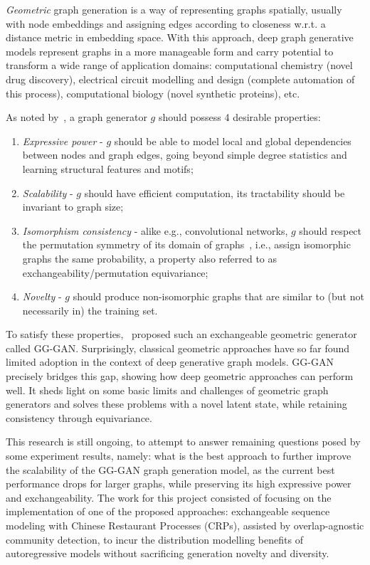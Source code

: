 \emph{Geometric} graph generation is a way of representing graphs spatially, usually with node embeddings and assigning edges according to closeness w.r.t. a distance metric in embedding space. With this approach, deep graph generative models represent graphs in a more manageable form and carry potential to transform a wide range of application domains: computational chemistry (novel drug discovery), electrical circuit modelling and design (complete automation of this process), computational biology (novel synthetic proteins), etc.

As noted by~\cite{krawczuk_gg-gan_2020}, a graph generator $g$ should possess 4 desirable properties:
\begin{enumerate}[1.]
\item \emph{Expressive power} - $g$ should be able to model local and global dependencies between nodes and graph edges, going beyond simple degree statistics and learning structural features and motifs;
\item \emph{Scalability} - $g$ should have efficient computation, its tractability should be invariant to graph size;
\item \emph{Isomorphism consistency} - alike e.g., convolutional networks, $g$ should respect the permutation symmetry of its domain of graphs~\cite{bronstein_geometric_2021}, i.e., assign isomorphic graphs the same probability, a property also referred to as exchangeability/permutation equivariance;
\item \emph{Novelty} - $g$ should produce non-isomorphic graphs that are similar to (but not necessarily in) the training set.
\end{enumerate}

To satisfy these properties,~\cite{krawczuk_gg-gan_2020} proposed such an exchangeable geometric generator called GG-GAN. Surprisingly, classical geometric approaches have so far found limited adoption in the context of deep generative graph models. GG-GAN precisely bridges this gap, showing how deep geometric approaches can perform well. It sheds light on some basic limits and challenges of geometric graph generators and solves these problems with a novel latent state, while retaining consistency through equivariance.

This research is still ongoing, to attempt to answer remaining questions posed by some experiment results, namely: what is the best approach to further improve the scalability of the GG-GAN graph generation model, as the current best performance drops for larger graphs, while preserving its high expressive power and exchangeability. The work for this project consisted of focusing on the implementation of one of the proposed approaches: exchangeable sequence modeling with Chinese Restaurant Processes (CRPs), assisted by overlap-agnostic community detection, to incur the distribution modelling benefits of autoregressive models without sacrificing generation novelty and diversity. 

